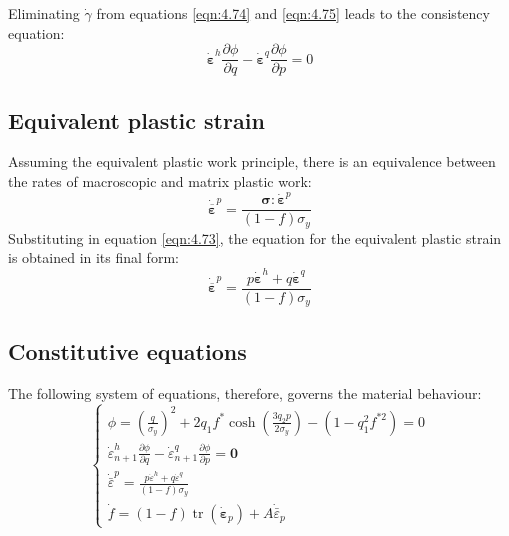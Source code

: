 \documentclass[sn-mathphys,Numbered,draft]{sn-jnl}%
\begin{document}
Eliminating $\dot{\gamma}$ from equations \ref{eqn:4.74}
and \ref{eqn:4.75} leads to the consistency equation:
\begin{equation}
\dot{ \boldsymbol{\varepsilon}}^h \frac{\partial \phi}{\partial q}-\dot{ \boldsymbol{\varepsilon}}^q \frac{\partial \phi}{\partial p}=0
\end{equation}

\subsection{Equivalent plastic strain}
Assuming the equivalent plastic work principle, there is an equivalence between the rates of macroscopic and matrix plastic work:
\begin{equation}
\dot{\overline{\boldsymbol{\varepsilon}}}^p=\frac{\boldsymbol{\sigma}: \dot{\boldsymbol{\varepsilon}}^p}{(1-f) \sigma_y}
\end{equation}
Substituting in equation \ref{eqn:4.73}, the equation for the equivalent plastic strain is obtained in its final form:
\begin{equation}
\dot{\overline{\boldsymbol{\varepsilon}}}^p=\frac{p \dot{ \boldsymbol{\varepsilon}}^h+q \dot{\boldsymbol{\varepsilon}}^q}{(1-f) \sigma_y}
\end{equation}

\subsection{Constitutive equations}
The following system of equations, therefore, governs the material behaviour:
\begin{equation}
\label{eqn:4.79}
\left\{\begin{array}{c}
\phi=\left(\frac{q}{\sigma_y}\right)^2+2 q_1 f^* \cosh \left(\frac{3 q_2 p}{2 \sigma_y}\right)-\left(1-q_1^2 f^{* 2}\right)=0 \\
\dot{\varepsilon}_{n+1}^h \frac{\partial \phi}{\partial q}-\dot{\varepsilon}_{n+1}^q \frac{\partial \phi}{\partial p}=\mathbf{0} \\
\dot{\bar{\varepsilon}}^p=\frac{p \dot{ \varepsilon}^h+q \dot{ \varepsilon}^q}{(1-f) \sigma_y} \\
\dot{f}=(1-f) \operatorname{tr}\left(\dot{\boldsymbol{\varepsilon}}_p\right)+A \dot{\bar{\varepsilon}}_p
\end{array}\right.
\end{equation}
\end{document}

